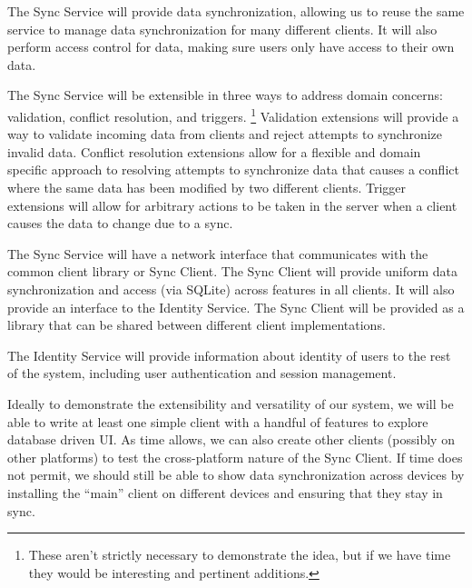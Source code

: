 \documentclass[12pt]{article}
\begin{document}
    The Sync Service will provide data synchronization, allowing us to reuse the same service to manage data synchronization for many different clients.
    It will also perform access control for data, making sure users only have access to their own data.

    The Sync Service will be extensible in three ways to address domain concerns: validation, conflict resolution, and triggers.
        \footnote{These aren't strictly necessary to demonstrate the idea, but if we have time they would be interesting and pertinent additions.}
        Validation extensions will provide a way to validate incoming data from clients and reject attempts to synchronize invalid data.
        Conflict resolution extensions allow for a flexible and domain specific approach to resolving attempts to synchronize data that causes a conflict where the same data has been modified by two different clients.
        Trigger extensions will allow for arbitrary actions to be taken in the server when a client causes the data to change due to a sync.

    The Sync Service will have a network interface that communicates with the common client library or Sync Client.
    The Sync Client will provide uniform data synchronization and access (via SQLite) across features in all clients.
    It will also provide an interface to the Identity Service.
        The Sync Client will be provided as a library that can be shared between different client implementations.

    The Identity Service will provide information about identity of users to the rest of the system, including user authentication and session management.

    Ideally to demonstrate the extensibility and versatility of our system, we will be able to write at least one simple client with a handful of features to explore database driven UI.
    As time allows, we can also create other clients (possibly on other platforms) to test the cross-platform nature of the Sync Client.
    If time does not permit, we should still be able to show data synchronization across devices by installing the “main” client on different devices and ensuring that they stay in sync.

\end{document}
